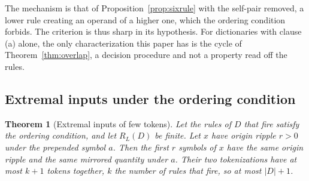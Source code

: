 \documentclass[11pt,a4paper]{article}
\theoremstyle{definition}
\theoremstyle{plain}
\newtheorem{theorem}{Theorem}
\newcommand{\ripple}{R_{L}}
\begin{document}
The mechanism is that of Proposition~\ref{prop:sixrule} with the self-pair removed, a lower rule creating an operand of
a higher one, which the ordering condition forbids. The criterion is thus sharp in its hypothesis. For dictionaries with
clause (a) alone, the only characterization this paper has is the cycle of Theorem~\ref{thm:overlap}, a decision
procedure and not a property read off the rules.

\subsection{Extremal inputs under the ordering condition}\label{sec:extremal}


\begin{theorem}[Extremal inputs of few tokens]\label{thm:witness}
Let the rules of \(D\) that fire satisfy the ordering condition, and let \(\ripple(D)\) be finite. Let \(x\) have origin
ripple \(r > 0\) under the prepended symbol \(a\). Then the first \(r\) symbols of \(x\) have the same origin ripple and
the same mirrored quantity under \(a\). Their two tokenizations have at most \(k + 1\) tokens together, \(k\) the number
of rules that fire, so at most \(|D| + 1\).
\end{theorem}
\end{document}
